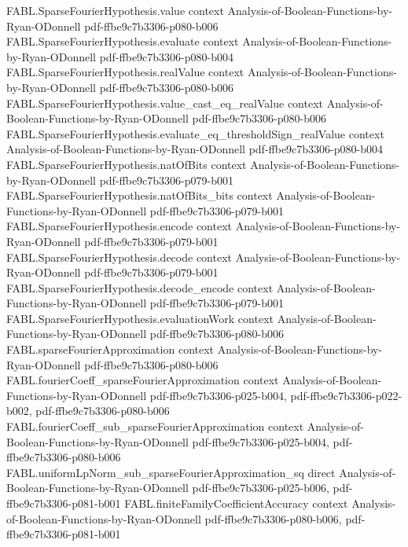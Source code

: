 \begin{theorem}
\proofstep
  {FABL.SparseFourierHypothesis.value}
  {context}
  {Analysis-of-Boolean-Functions-by-Ryan-ODonnell}
  {pdf-ffbe9c7b3306-p080-b006}
\proofstep
  {FABL.SparseFourierHypothesis.evaluate}
  {context}
  {Analysis-of-Boolean-Functions-by-Ryan-ODonnell}
  {pdf-ffbe9c7b3306-p080-b004}
\proofstep
  {FABL.SparseFourierHypothesis.realValue}
  {context}
  {Analysis-of-Boolean-Functions-by-Ryan-ODonnell}
  {pdf-ffbe9c7b3306-p080-b006}
\proofstep
  {FABL.SparseFourierHypothesis.value_cast_eq_realValue}
  {context}
  {Analysis-of-Boolean-Functions-by-Ryan-ODonnell}
  {pdf-ffbe9c7b3306-p080-b006}
\proofstep
  {FABL.SparseFourierHypothesis.evaluate_eq_thresholdSign_realValue}
  {context}
  {Analysis-of-Boolean-Functions-by-Ryan-ODonnell}
  {pdf-ffbe9c7b3306-p080-b004}
\proofstep
  {FABL.SparseFourierHypothesis.natOfBits}
  {context}
  {Analysis-of-Boolean-Functions-by-Ryan-ODonnell}
  {pdf-ffbe9c7b3306-p079-b001}
\proofstep
  {FABL.SparseFourierHypothesis.natOfBits_bits}
  {context}
  {Analysis-of-Boolean-Functions-by-Ryan-ODonnell}
  {pdf-ffbe9c7b3306-p079-b001}
\proofstep
  {FABL.SparseFourierHypothesis.encode}
  {context}
  {Analysis-of-Boolean-Functions-by-Ryan-ODonnell}
  {pdf-ffbe9c7b3306-p079-b001}
\proofstep
  {FABL.SparseFourierHypothesis.decode}
  {context}
  {Analysis-of-Boolean-Functions-by-Ryan-ODonnell}
  {pdf-ffbe9c7b3306-p079-b001}
\proofstep
  {FABL.SparseFourierHypothesis.decode_encode}
  {context}
  {Analysis-of-Boolean-Functions-by-Ryan-ODonnell}
  {pdf-ffbe9c7b3306-p079-b001}
\proofstep
  {FABL.SparseFourierHypothesis.evaluationWork}
  {context}
  {Analysis-of-Boolean-Functions-by-Ryan-ODonnell}
  {pdf-ffbe9c7b3306-p080-b006}
\proofstep
  {FABL.sparseFourierApproximation}
  {context}
  {Analysis-of-Boolean-Functions-by-Ryan-ODonnell}
  {pdf-ffbe9c7b3306-p080-b006}
\proofstep
  {FABL.fourierCoeff_sparseFourierApproximation}
  {context}
  {Analysis-of-Boolean-Functions-by-Ryan-ODonnell}
  {pdf-ffbe9c7b3306-p025-b004,
    pdf-ffbe9c7b3306-p022-b002,
    pdf-ffbe9c7b3306-p080-b006}
\proofstep
  {FABL.fourierCoeff_sub_sparseFourierApproximation}
  {context}
  {Analysis-of-Boolean-Functions-by-Ryan-ODonnell}
  {pdf-ffbe9c7b3306-p025-b004,
    pdf-ffbe9c7b3306-p080-b006}
\proofstep
  {FABL.uniformLpNorm_sub_sparseFourierApproximation_sq}
  {direct}
  {Analysis-of-Boolean-Functions-by-Ryan-ODonnell}
  {pdf-ffbe9c7b3306-p025-b006,
    pdf-ffbe9c7b3306-p081-b001}
\proofstep
  {FABL.finiteFamilyCoefficientAccuracy}
  {context}
  {Analysis-of-Boolean-Functions-by-Ryan-ODonnell}
  {pdf-ffbe9c7b3306-p080-b006,
    pdf-ffbe9c7b3306-p081-b001}
\proofstep

\end{theorem}

